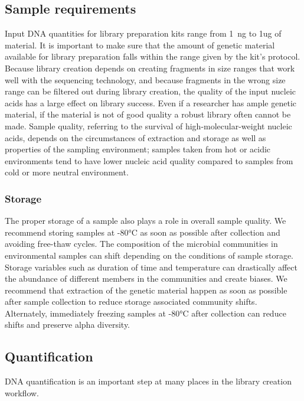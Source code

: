 \documentclass[graybox]{svmult}
\begin{document}
\subsection{Sample requirements }
\label{subsec:4}
%
Input DNA quantities for library preparation kits range from 1~ng to  1ug of material. It is important to make sure that the amount of genetic material available for library preparation falls within the range given by the kit's protocol.
%
Because library creation depends on creating fragments in size ranges that work well with the sequencing technology, and because fragments in the wrong size range can be filtered out during library creation,  the quality of the input nucleic acids has a large effect on library success. 
Even if a researcher has ample genetic material, if the material is not of good quality a robust library often cannot be made. 
Sample quality, referring to the survival of high-molecular-weight nucleic acids, depends on the circumstances of extraction and storage as well as properties of the sampling environment; samples taken from hot or acidic environments tend to have lower nucleic acid quality compared to samples from cold or more neutral environment.

\subsubsection{Storage}
The proper storage of a sample also plays a role in overall sample quality. We recommend storing samples at -80°C as soon as possible after collection and avoiding free-thaw cycles.  The composition of the microbial communities in environmental samples can shift depending on the conditions of sample storage. Storage variables such as duration of time and temperature can drastically affect the abundance of different members in the communities and create biases. We recommend that extraction of the genetic material happen as soon as possible after sample collection to reduce storage associated community shifts. Alternately, immediately freezing samples at -80°C after collection can reduce shifts and preserve alpha diversity.\cite{Rubin}

\subsection{Quantification}
DNA quantification is an important step at many places in the library creation workflow.
\end{document}

